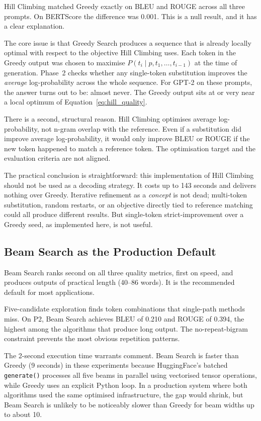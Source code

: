 \documentclass[12pt]{article}
\begin{document}
	Hill Climbing matched Greedy exactly on BLEU and ROUGE across all three prompts. On BERTScore the difference was 0.001. This is a null result, and it has a clear explanation.
	
	The core issue is that Greedy Search produces a sequence that is already locally optimal with respect to the objective Hill Climbing uses. Each token in the Greedy output was chosen to maximise $P(t_i \mid p, t_1, \ldots, t_{i-1})$ at the time of generation. Phase~2 checks whether any single-token substitution improves the \emph{average} log-probability across the whole sequence. For GPT-2 on these prompts, the answer turns out to be: almost never. The Greedy output sits at or very near a local optimum of Equation~\eqref{eq:hill_quality}.
	
	There is a second, structural reason. Hill Climbing optimises average log-probability, not n-gram overlap with the reference. Even if a substitution did improve average log-probability, it would only improve BLEU or ROUGE if the new token happened to match a reference token. The optimisation target and the evaluation criteria are not aligned.
	
	The practical conclusion is straightforward: this implementation of Hill Climbing should not be used as a decoding strategy. It costs up to 143 seconds and delivers nothing over Greedy. Iterative refinement as a \emph{concept} is not dead; multi-token substitution, random restarts, or an objective directly tied to reference matching could all produce different results. But single-token strict-improvement over a Greedy seed, as implemented here, is not useful.
	
	\subsection{Beam Search as the Production Default}
	\label{sec:beam_discussion}
	
	Beam Search ranks second on all three quality metrics, first on speed, and produces outputs of practical length (40--86 words). It is the recommended default for most applications.
	
	Five-candidate exploration finds token combinations that single-path methods miss. On P2, Beam Search achieves BLEU of 0.210 and ROUGE of 0.394, the highest among the algorithms that produce long output. The no-repeat-bigram constraint prevents the most obvious repetition patterns.
	
	The 2-second execution time warrants comment. Beam Search is faster than Greedy (9 seconds) in these experiments because HuggingFace's batched \texttt{generate()} processes all five beams in parallel using vectorised tensor operations, while Greedy uses an explicit Python loop. In a production system where both algorithms used the same optimised infrastructure, the gap would shrink, but Beam Search is unlikely to be noticeably slower than Greedy for beam widths up to about 10.
	
\end{document}
